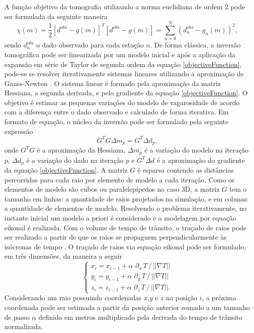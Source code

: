 A função objetivo da tomografia utilizando a norma euclidiana de ordem 2 pode ser formulada da seguinte maneira
\begin{equation}
	\chi(m) = \dfrac{1}{2}\left[d^{obs} - g(m)\right]^T\left[d^{obs} - g(m)\right] = \displaystyle\sum_{n = 0}^N(d^{obs}_n - g_n(m))^2, 
	\label{objectiveFunction}
\end{equation} 
\noindent sendo $d^{obs}_n$ o dado observado para cada estação $n$. De forma clássica, a inversão tomográfica pode ser linearizada por um modelo inicial e após a aplicação da expansão em série de Taylor de segunda ordem da equação \ref{objectiveFunction}, pode-se se resolver iterativamente sistemas lineares utilizando a aproximação de Gauss-Newton \cite{tarantola2005inverse, menke2018geophysical, aster2018parameter}. O sistema linear é formado pela aproximação da matriz Hessiana, a segunda derivada, e pelo gradiente da equação \ref{objectiveFunction}. O objetivo é estimar as pequenas variações do modelo de vagarosidade de acordo com a diferença entre o dado observado e calculado de forma iterativa. Em formato de equação, o núcleo da inversão pode ser formulado pela seguinte expressão 
\begin{equation}
	G^TG \Delta m_p = G^T\Delta d_p, 		
	\label{linearSystem}
\end{equation} 
\noindent onde $G^TG$ é a aproximação da Hessiana, $\Delta m_p$ é a variação do modelo na iteração $p$, $\Delta d_p$ é a variação do dado na iteração $p$ e $G^T\Delta d$ é a aproximação do gradiente da equação \ref{objectiveFunction}. A matriz $G$ é esparsa contendo as distâncias percorridas para cada raio por elemento de modelo a cada iteração. Como os elementos de modelo são cubos ou paralelepípedos no caso 3D, a matriz $G$ tem o tamanho em linhas: a quantidade de raios projetados na simulação, e em colunas: a quantidade de elementos de modelo. Resolvendo o problema iterativamente, no instante inicial um modelo a priori é considerado e a modelagem por equação eikonal é realizada. Com o volume de tempo de trânsito, o traçado de raios pode ser realizado a partir de que os raios se propaguem perpendicularmente às isócronas de tempo \cite{vidale1988finite}. O traçado de raios via equação eikonal pode ser formulado, em três dimensões, da maneira a seguir
\begin{equation}
	\begin{cases}
		x_i = x_{i-1} + \alpha\,\, \partial_x\, T \,/\, ||\nabla T|| \\ 
		y_i = y_{i-1} + \alpha\,\, \partial_y\, T \,/\, ||\nabla T|| \\ 
		z_i = z_{i-1} + \alpha\,\, \partial_z\, T \,/\, ||\nabla T||. 
	\end{cases}
	\label{rayTracing}
\end{equation}
\noindent Considerando um raio possuindo coordenadas $x$,$y$ e $z$ na posição $i$, a próxima coordenada pode ser estimada a partir da posição anterior somado a um tamanho de passo $\alpha$ definido em metros multiplicado pela derivada do tempo de trânsito normalizada.  

